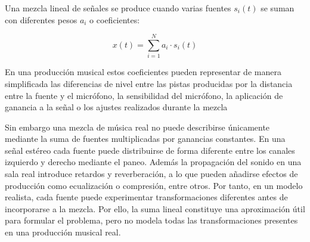 Una mezcla lineal de señales se produce cuando varias fuentes \(s_i(t)\) se suman con diferentes pesos \(a_i\) o coeficientes:

\begin{center}
    \[
x(t) = \sum_{i=1}^{N} a_i \cdot s_i(t)
\]
\end{center}

En una producción musical estos coeficientes pueden representar de manera simplificada las diferencias de nivel entre las pistas producidas por la distancia entre la fuente y el micrófono, la sensibilidad del micrófono, la aplicación de ganancia a la señal o los ajustes realizados durante la mezcla

Sin embargo una mezcla de música real no puede describirse únicamente mediante la suma de fuentes multiplicadas por ganancias constantes. En una señal estéreo cada fuente puede distribuirse de forma diferente entre los canales izquierdo y derecho mediante el paneo. Además la propagación del sonido en una sala real introduce
retardos y reverberación, a lo que pueden añadirse efectos de producción como ecualización o compresión, entre otros. Por tanto, en un modelo realista, cada fuente puede experimentar transformaciones diferentes antes de incorporarse a la mezcla. Por ello, la suma lineal constituye una aproximación útil para formular el problema, pero no modela todas las transformaciones presentes en una producción musical real.
